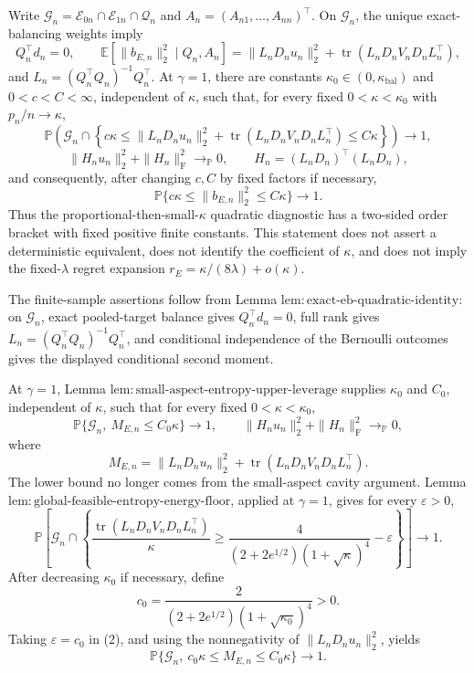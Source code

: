 Write \(\mathcal G_n=\mathcal E_{0n}\cap\mathcal E_{1n}\cap\mathcal Q_n\) and \(A_n=(A_{n1},\ldots,A_{nn})^\top\).  On \(\mathcal G_n\), the unique exact-balancing weights imply
\[
 Q_n^\top d_n=0,
 \qquad
 \mathbb E[\|b_{E,n}\|_2^2\mid Q_n,A_n]
 =\|L_nD_nu_n\|_2^2+
 \operatorname{tr}(L_nD_nV_nD_nL_n^\top),
\]
and \(L_n=(Q_n^\top Q_n)^{-1}Q_n^\top\).  At \(\gamma=1\), there are constants \(\kappa_0\in(0,\kappa_{\mathrm{bal}})\) and \(0<c<C<\infty\), independent of \(\kappa\), such that, for every fixed \(0<\kappa<\kappa_0\) with \(p_n/n\to\kappa\),
\[
 \mathbb P\!\left(
 \mathcal G_n\cap
 \left\{c\kappa\le
 \|L_nD_nu_n\|_2^2+
 \operatorname{tr}(L_nD_nV_nD_nL_n^\top)
 \le C\kappa\right\}\right)\longrightarrow1,
\]
\[
 \|H_nu_n\|_2^2+\|H_n\|_{\mathrm F}^2
 \longrightarrow_{\mathbb P}0,
 \qquad H_n=(L_nD_n)^\top(L_nD_n),
\]
and consequently, after changing \(c,C\) by fixed factors if necessary,
\[
 \mathbb P\{c\kappa\le\|b_{E,n}\|_2^2\le C\kappa\}
 \longrightarrow1.
\]
Thus the proportional-then-small-\(\kappa\) quadratic diagnostic has a two-sided order bracket with fixed positive finite constants.  This statement does not assert a deterministic equivalent, does not identify the coefficient of \(\kappa\), and does not imply the fixed-\(\lambda\) regret expansion \(r_E=\kappa/(8\lambda)+o(\kappa)\).

The finite-sample assertions follow from Lemma \(\mathrm{lem{:}exact\mbox{-}eb\mbox{-}quadratic\mbox{-}identity}\): on \(\mathcal G_n\), exact pooled-target balance gives \(Q_n^\top d_n=0\), full rank gives \(L_n=(Q_n^\top Q_n)^{-1}Q_n^\top\), and conditional independence of the Bernoulli outcomes gives the displayed conditional second moment.

At \(\gamma=1\), Lemma \(\mathrm{lem{:}small\mbox{-}aspect\mbox{-}entropy\mbox{-}upper\mbox{-}leverage}\) supplies \(\kappa_0\) and \(C_0\), independent of \(\kappa\), such that for every fixed \(0<\kappa<\kappa_0\),
\[
 \mathbb P\{\mathcal G_n,\ M_{E,n}\le C_0\kappa\}\to1,
 \qquad
 \|H_nu_n\|_2^2+\|H_n\|_{\mathrm F}^2\to_{\mathbb P}0,
 \tag{1}
\]
where
\[
 M_{E,n}=\|L_nD_nu_n\|_2^2+
 \operatorname{tr}(L_nD_nV_nD_nL_n^\top).
\]
The lower bound no longer comes from the small-aspect cavity argument.  Lemma \(\mathrm{lem{:}global\mbox{-}feasible\mbox{-}entropy\mbox{-}energy\mbox{-}floor}\), applied at \(\gamma=1\), gives for every \(\varepsilon>0\),
\[
 \mathbb P\!\left[
 \mathcal G_n\cap
 \left\{
 \frac{\operatorname{tr}(L_nD_nV_nD_nL_n^\top)}\kappa
 \ge \frac4{(2+2e^{1/2})(1+\sqrt\kappa)^4}-\varepsilon
 \right\}\right]\to1.
 \tag{2}
\]
After decreasing \(\kappa_0\) if necessary, define
\[
 c_0=\frac2{(2+2e^{1/2})(1+\sqrt{\kappa_0})^4}>0.
\]
Taking \(\varepsilon=c_0\) in (2), and using the nonnegativity of \(\|L_nD_nu_n\|_2^2\), yields
\[
 \mathbb P\{\mathcal G_n,\ c_0\kappa\le M_{E,n}\le C_0\kappa\}\to1.
 \tag{3}
\]

